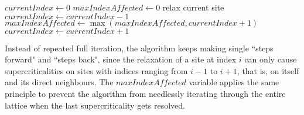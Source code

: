 \documentclass[a4paper,12pt]{article}
\begin{document}
\begin{algorithmic}

\STATE $currentIndex\gets 0$
\STATE $maxIndexAffected\gets 0$
		\STATE relax current site
		\STATE $currentIndex\gets currentIndex - 1$
		\STATE $maxIndexAffected\gets \max(maxIndexAffected, currentIndex+1)$
	\ELSE
		\STATE $currentIndex\gets currentIndex + 1$
	\ENDIF
\ENDWHILE

Instead of repeated full iteration, the algorithm keeps making single ``steps forward" and ``steps back", since the relaxation of a site at index $i$ can only cause supercriticalities on sites with indices ranging from $i-1$ to $i+1$, that is, on itself and its direct neighbours. The $maxIndexAffected$ variable applies the same principle to prevent the algorithm from needlessly iterating through the entire lattice when the last supercriticality gets resolved.

\end{algorithmic}
\end{document}
